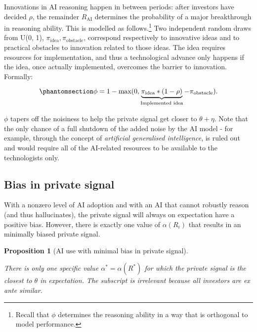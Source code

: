 \documentclass[
]{article}
\theoremstyle{plain}
\newtheorem{proposition}{Proposition}[section]
\theoremstyle{definition}
\theoremstyle{remark}
\begin{document}
Innovations in AI reasoning happen in between periods: after investors
have decided \(\rho\), the remainder \(R_{\text{AI}}\) determines the
probability of a major breakthrough in reasoning ability. This is
modelled as follows.\footnote{Recall that \(\phi\) determines the
  reasoning ability in a way that is orthogonal to model performance.}
Two independent random draws from U(0, 1),
\(\pi_{\text{idea}}, \pi_{\text{obstacle}}\), correspond respectively to
innovative ideas and to practical obstacles to innovation related to
those ideas. The idea requires resources for implementation, and thus a
technological advance only happens if the idea, once actually
implemented, overcomes the barrier to innovation. Formally:

\begin{equation}\phantomsection\label{eq-tech}{
\phi = 1-\text{max}(0, \underbrace{\pi_{\text{idea}} * (1-\rho)}_{\text{Implemented idea}} - \pi_{\text{obstacle}}).
}\end{equation}

\(\phi\) tapers off the noisiness to help the private signal get closer
to \(\theta + \eta\). Note that the only chance of a full shutdown of
the added noise by the AI model - for example, through the concept of
\emph{artificial generalised intelligence}, is ruled out and would
require all of the AI-related resources to be available to the
technologists only.

\subsection{Bias in private signal}\label{bias-in-private-signal}

With a nonzero level of AI adoption and with an AI that cannot robustly
reason (and thus hallucinates), the private signal will always on
expectation have a positive bias. However, there is exactly one value of
\(\alpha(R_i)\) that results in an minimally biased private signal.

\begin{proposition}[AI use with minimal bias in private
signal]\protect\hypertarget{prp-alphainvestlowestbias}{}\label{prp-alphainvestlowestbias}

There is only one specific value \(\alpha^* = \alpha(R^*)\) for which
the private signal is the closest to \(\theta\) in expectation. The
subscript is irrelevant because all investors are ex ante similar.

\end{proposition}
\end{document}

